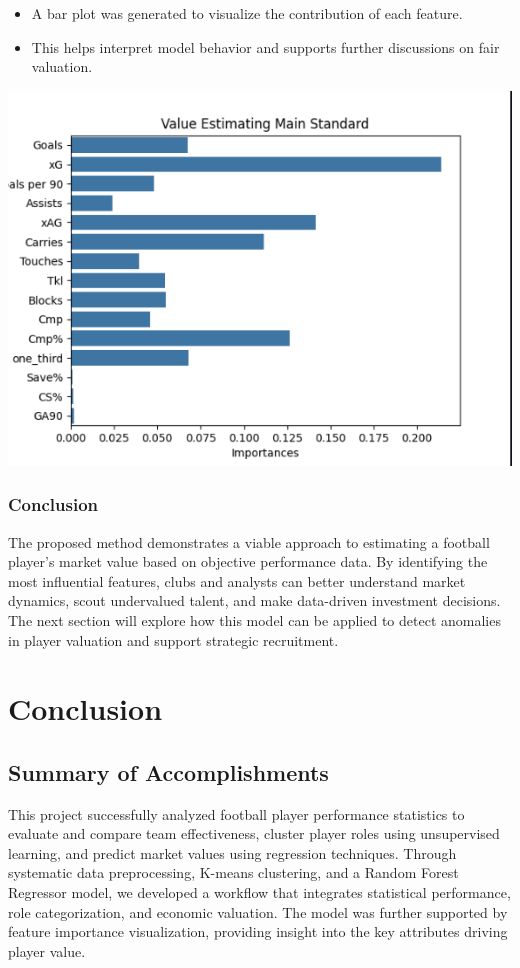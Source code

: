 \documentclass[a4paper,12pt]{article}
\begin{document}
\begin{itemize}
    \item A bar plot was generated to visualize the contribution of each feature.
    \item This helps interpret model behavior and supports further discussions on fair valuation.
\end{itemize}
\includegraphics{image.png}

\subsubsection{Conclusion}

The proposed method demonstrates a viable approach to estimating a football player's market value based on objective performance data. By identifying the most influential features, clubs and analysts can better understand market dynamics, scout undervalued talent, and make data-driven investment decisions. The next section will explore how this model can be applied to detect anomalies in player valuation and support strategic recruitment.

\newpage
\section{Conclusion}

\subsection{Summary of Accomplishments}
This project successfully analyzed football player performance statistics to evaluate and compare team effectiveness, cluster player roles using unsupervised learning, and predict market values using regression techniques. Through systematic data preprocessing, K-means clustering, and a Random Forest Regressor model, we developed a workflow that integrates statistical performance, role categorization, and economic valuation. The model was further supported by feature importance visualization, providing insight into the key attributes driving player value.
\end{document}
